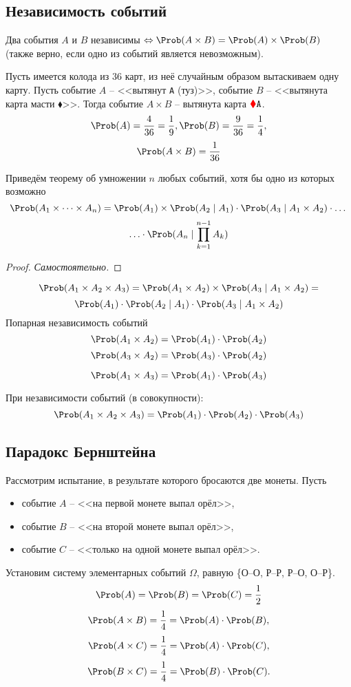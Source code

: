 \subsection{Независимость событий}
\begin{definition}
	Два события $A$ и $B$ независимы $\Leftrightarrow \Prob(A \times B) = \Prob(A) \times \Prob(B)$ (также верно, если одно из событий является невозможным).
\end{definition}
\begin{example}
	Пусть имеется колода из 36 карт, из неё случайным образом вытаскиваем одну карту. Пусть событие $A$ -- <<вытянут \texttt{A} (туз)>>, событие $B$ -- <<вытянута карта масти {\color{red} $\blacklozenge$}>>. Тогда событие $A \times B$ -- вытянута карта ${\color{red} \blacklozenge} \texttt{A}$.
	\[
		\Prob(A) = \frac{4}{36} = \frac{1}{9}, \Prob(B) = \frac{9}{36} = \frac{1}{4},
	\]
	\[
		\Prob(A \times B) = \frac{1}{36}
	\]
\end{example}
Приведём теорему об умножении $n$ любых событий, хотя бы одно из которых возможно
\[
	\Prob(A_1 \times \dots \times A_n) = \Prob(A_1) \times \Prob(A_2 \mid A_1) \cdot \Prob(A_3 \mid A_1 \times A_2) \cdot \dots
\]
\[
	\ldots \cdot \Prob(A_n \mid \prod\limits_{k = 1}^{n-1} A_k)
\]
\begin{proof}
\textit{Самостоятельно.}
\end{proof}
\[
	\Prob(A_1 \times A_2 \times A_3) = \Prob(A_1 \times A_2) \times \Prob(A_3 \mid A_1 \times A_2) =
\]
\[
	\Prob(A_1) \cdot \Prob(A_2 \mid A_1) \cdot \Prob(A_3 \mid A_1 \times A_2)
\]
Попарная независимость событий
\begin{equation}\label{1-5-3}
		\Prob(A_1 \times A_2) = \Prob(A_1) \cdot \Prob(A_2)
\end{equation}
\[
	\Prob(A_3 \times A_2) = \Prob(A_3) \cdot \Prob(A_2)
\]

\[
	\Prob(A_1 \times A_3) = \Prob(A_1) \cdot \Prob(A_3)
\]

При независимости событий (в совокупности):
\begin{equation}\label{1-5-4}
	\Prob(A_1 \times A_2 \times A_3) = \Prob(A_1) \cdot \Prob(A_2) \cdot \Prob(A_3)
\end{equation}
\subsection{Парадокс Бернштейна}
Рассмотрим испытание, в результате которого бросаются две монеты. Пусть
\begin{itemize}
	\item событие $A$ -- <<на первой монете выпал орёл>>,
	\item событие $B$ -- <<на второй монете выпал орёл>>,
	\item событие $C$ -- <<только на одной монете выпал орёл>>.
\end{itemize}
Установим систему элементарных событий $\Omega$, равную \{О--О, Р--Р, Р--О, О--Р\}.
\[
	\Prob(A) = \Prob(B) = \Prob(C) = \frac{1}{2}
\]
\[ \Prob(A \times B) = \frac{1}{4} = \Prob(A) \cdot \Prob(B), \]
\[ \Prob(A \times C) = \frac{1}{4} = \Prob(A) \cdot \Prob(C), \]
\[ \Prob(B \times C) = \frac{1}{4} = \Prob(B) \cdot \Prob(C). \]

